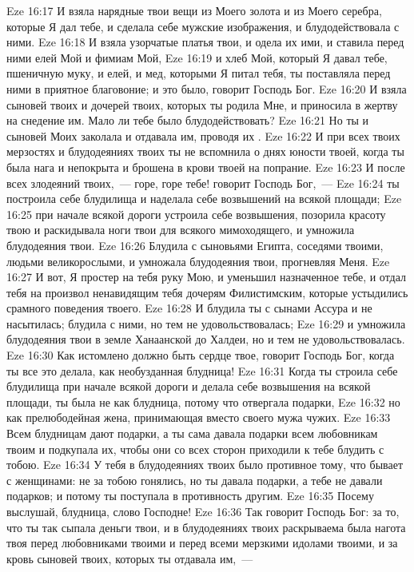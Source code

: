 \vs Eze 16:17 И взяла нарядные твои вещи из Моего золота и из Моего серебра, которые Я дал тебе, и сделала себе мужские изображения, и блудодействовала с ними.
\vs Eze 16:18 И взяла узорчатые платья твои, и одела их ими, и ставила перед ними елей Мой и фимиам Мой,
\vs Eze 16:19 и хлеб Мой, который Я давал тебе, пшеничную муку, и елей, и мед, которыми Я питал тебя, ты поставляла перед ними в приятное благовоние; и это было, говорит Господь Бог.
\vs Eze 16:20 И взяла сыновей твоих и дочерей твоих, которых ты родила Мне, и приносила в жертву на снедение им. Мало ли тебе было блудодействовать?
\vs Eze 16:21 Но ты и сыновей Моих заколала и отдавала им, проводя их .
\vs Eze 16:22 И при всех твоих мерзостях и блудодеяниях твоих ты не вспомнила о днях юности твоей, когда ты была нага и непокрыта и брошена в крови твоей на попрание.
\vs Eze 16:23 И после всех злодеяний твоих,~--- горе, горе тебе! говорит Господь Бог,~---
\vs Eze 16:24 ты построила себе блудилища и наделала себе возвышений на всякой площади;
\vs Eze 16:25 при начале всякой дороги устроила себе возвышения, позорила красоту твою и раскидывала ноги твои для всякого мимоходящего, и умножила блудодеяния твои.
\vs Eze 16:26 Блудила с сыновьями Египта, соседями твоими, людьми великорослыми, и умножала блудодеяния твои, прогневляя Меня.
\vs Eze 16:27 И вот, Я простер на тебя руку Мою, и уменьшил назначенное тебе, и отдал тебя на произвол ненавидящим тебя дочерям Филистимским, которые устыдились срамного поведения твоего.
\vs Eze 16:28 И блудила ты с сынами Ассура и не насытилась; блудила с ними, но тем не удовольствовалась;
\vs Eze 16:29 и умножила блудодеяния твои в земле Ханаанской до Халдеи, но и тем не удовольствовалась.
\vs Eze 16:30 Как истомлено должно быть сердце твое, говорит Господь Бог, когда ты все это делала, как необузданная блудница!
\vs Eze 16:31 Когда ты строила себе блудилища при начале всякой дороги и делала себе возвышения на всякой площади, ты была не как блудница, потому что отвергала подарки,
\vs Eze 16:32 но как прелюбодейная жена, принимающая вместо своего мужа чужих.
\vs Eze 16:33 Всем блудницам дают подарки, а ты сама давала подарки всем любовникам твоим и подкупала их, чтобы они со всех сторон приходили к тебе блудить с тобою.
\vs Eze 16:34 У тебя в блудодеяниях твоих было противное тому, что бывает с женщинами: не за тобою гонялись, но ты давала подарки, а тебе не давали подарков; и потому ты поступала в противность другим.
\vs Eze 16:35 Посему выслушай, блудница, слово Господне!
\vs Eze 16:36 Так говорит Господь Бог: за то, что ты так сыпала деньги твои, и в блудодеяниях твоих раскрываема была нагота твоя перед любовниками твоими и перед всеми мерзкими идолами твоими, и за кровь сыновей твоих, которых ты отдавала им,~---
